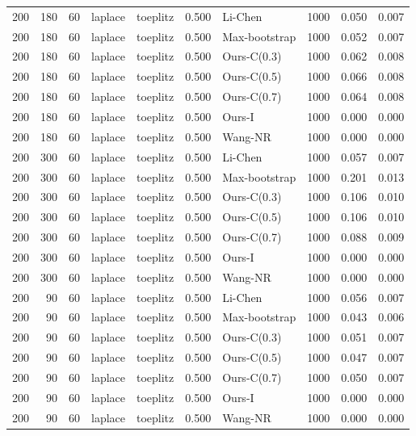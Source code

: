 \begin{tabular}{rrrllrlrrr}
200 & 180 & 60 & laplace & toeplitz & 0.500 & Li-Chen & 1000 & 0.050 & 0.007 \\
200 & 180 & 60 & laplace & toeplitz & 0.500 & Max-bootstrap & 1000 & 0.052 & 0.007 \\
200 & 180 & 60 & laplace & toeplitz & 0.500 & Ours-C(0.3) & 1000 & 0.062 & 0.008 \\
200 & 180 & 60 & laplace & toeplitz & 0.500 & Ours-C(0.5) & 1000 & 0.066 & 0.008 \\
200 & 180 & 60 & laplace & toeplitz & 0.500 & Ours-C(0.7) & 1000 & 0.064 & 0.008 \\
200 & 180 & 60 & laplace & toeplitz & 0.500 & Ours-I & 1000 & 0.000 & 0.000 \\
200 & 180 & 60 & laplace & toeplitz & 0.500 & Wang-NR & 1000 & 0.000 & 0.000 \\
200 & 300 & 60 & laplace & toeplitz & 0.500 & Li-Chen & 1000 & 0.057 & 0.007 \\
200 & 300 & 60 & laplace & toeplitz & 0.500 & Max-bootstrap & 1000 & 0.201 & 0.013 \\
200 & 300 & 60 & laplace & toeplitz & 0.500 & Ours-C(0.3) & 1000 & 0.106 & 0.010 \\
200 & 300 & 60 & laplace & toeplitz & 0.500 & Ours-C(0.5) & 1000 & 0.106 & 0.010 \\
200 & 300 & 60 & laplace & toeplitz & 0.500 & Ours-C(0.7) & 1000 & 0.088 & 0.009 \\
200 & 300 & 60 & laplace & toeplitz & 0.500 & Ours-I & 1000 & 0.000 & 0.000 \\
200 & 300 & 60 & laplace & toeplitz & 0.500 & Wang-NR & 1000 & 0.000 & 0.000 \\
200 & 90 & 60 & laplace & toeplitz & 0.500 & Li-Chen & 1000 & 0.056 & 0.007 \\
200 & 90 & 60 & laplace & toeplitz & 0.500 & Max-bootstrap & 1000 & 0.043 & 0.006 \\
200 & 90 & 60 & laplace & toeplitz & 0.500 & Ours-C(0.3) & 1000 & 0.051 & 0.007 \\
200 & 90 & 60 & laplace & toeplitz & 0.500 & Ours-C(0.5) & 1000 & 0.047 & 0.007 \\
200 & 90 & 60 & laplace & toeplitz & 0.500 & Ours-C(0.7) & 1000 & 0.050 & 0.007 \\
200 & 90 & 60 & laplace & toeplitz & 0.500 & Ours-I & 1000 & 0.000 & 0.000 \\
200 & 90 & 60 & laplace & toeplitz & 0.500 & Wang-NR & 1000 & 0.000 & 0.000 \\
\bottomrule
\end{tabular}
